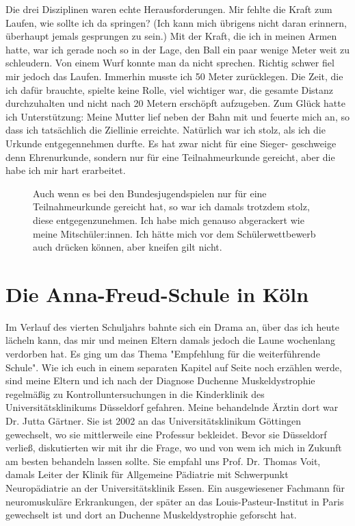 \documentclass[fontsize=14pt,a4paper,headinclude,DIV=calc,automark]{scrbook}
\begin{document}
Die drei Disziplinen waren echte Herausforderungen. Mir fehlte die Kraft zum Laufen, wie sollte ich da springen? (Ich kann mich übrigens nicht daran erinnern, überhaupt jemals gesprungen zu sein.) Mit der Kraft, die ich in meinen Armen hatte, war ich gerade noch so in der Lage, den Ball ein paar wenige Meter weit zu schleudern. Von einem Wurf konnte man da nicht sprechen. Richtig schwer fiel mir jedoch das Laufen. Immerhin musste ich 50 Meter zurücklegen. Die Zeit, die ich dafür brauchte, spielte keine Rolle, viel wichtiger war, die gesamte Distanz durchzuhalten und nicht nach 20 Metern erschöpft aufzugeben. Zum Glück hatte ich Unterstützung: Meine Mutter lief neben der Bahn mit und feuerte mich an, so dass ich tatsächlich die Ziellinie erreichte. Natürlich war ich stolz, als ich die Urkunde entgegennehmen durfte. Es hat zwar nicht für eine Sieger- geschweige denn Ehrenurkunde, sondern nur für eine Teilnahmeurkunde gereicht, aber die habe ich mir hart erarbeitet.

\setlength{\fboxsep}{0pt}    %
\setlength{\fboxrule}{0.2pt} %
\begin{figure}[H]
    \centering
    \caption{Auch wenn es bei den Bundesjugendspielen nur für eine Teilnahmeurkunde gereicht hat, so war ich damals trotzdem stolz, diese entgegenzunehmen. Ich habe mich genauso abgerackert wie meine Mitschüler:innen. Ich hätte mich vor dem Schülerwettbewerb auch drücken können, aber kneifen gilt nicht.}
    \label{fig:bundesjugendspiele}
\end{figure}

\section{Die Anna-Freud-Schule in Köln}

Im Verlauf des vierten Schuljahrs bahnte sich ein Drama an, über das ich heute lächeln kann, das mir und meinen Eltern damals jedoch die Laune wochenlang verdorben hat. Es ging um das Thema "Empfehlung für die weiterführende Schule". Wie ich euch in einem separaten Kapitel auf Seite \pageref{sec:kontrolluntersuchungen} noch erzählen werde, sind meine Eltern und ich nach der Diagnose Duchenne Muskeldystrophie regelmäßig zu Kontrolluntersuchungen in die Kinderklinik des Universitätsklinikums Düsseldorf gefahren. Meine behandelnde Ärztin dort war Dr. Jutta Gärtner. Sie ist 2002 an das Universitätsklinikum Göttingen gewechselt, wo sie mittlerweile eine Professur bekleidet. Bevor sie Düsseldorf verließ, diskutierten wir mit ihr die Frage, wo und von wem ich mich in Zukunft am besten behandeln lassen sollte. Sie empfahl uns Prof. Dr. Thomas Voit, damals Leiter der Klinik für Allgemeine Pädiatrie mit Schwerpunkt Neuropädiatrie an der Universitätsklinik Essen. Ein ausgewiesener Fachmann für neuromuskuläre Erkrankungen, der später an das Louis-Pasteur-Institut in Paris gewechselt ist und dort an Duchenne Muskeldystrophie geforscht hat.
\end{document}
